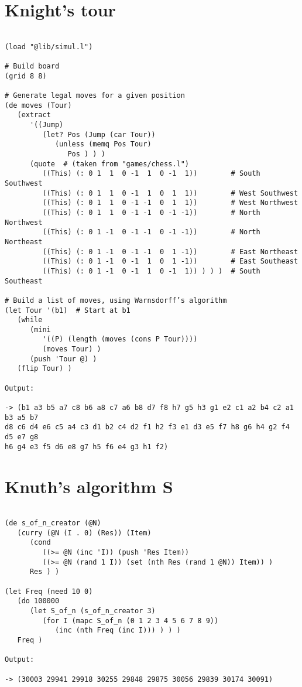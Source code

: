 \section*{Knight's tour}

\begin{verbatim}

(load "@lib/simul.l")

# Build board
(grid 8 8)

# Generate legal moves for a given position
(de moves (Tour)
   (extract
      '((Jump)
         (let? Pos (Jump (car Tour))
            (unless (memq Pos Tour)
               Pos ) ) )
      (quote  # (taken from "games/chess.l")
         ((This) (: 0 1  1  0 -1  1  0 -1  1))        # South Southwest
         ((This) (: 0 1  1  0 -1  1  0  1  1))        # West Southwest
         ((This) (: 0 1  1  0 -1 -1  0  1  1))        # West Northwest
         ((This) (: 0 1  1  0 -1 -1  0 -1 -1))        # North Northwest
         ((This) (: 0 1 -1  0 -1 -1  0 -1 -1))        # North Northeast
         ((This) (: 0 1 -1  0 -1 -1  0  1 -1))        # East Northeast
         ((This) (: 0 1 -1  0 -1  1  0  1 -1))        # East Southeast
         ((This) (: 0 1 -1  0 -1  1  0 -1  1)) ) ) )  # South Southeast

# Build a list of moves, using Warnsdorff’s algorithm
(let Tour '(b1)  # Start at b1
   (while
      (mini
         '((P) (length (moves (cons P Tour))))
         (moves Tour) )
      (push 'Tour @) )
   (flip Tour) )

Output:

-> (b1 a3 b5 a7 c8 b6 a8 c7 a6 b8 d7 f8 h7 g5 h3 g1 e2 c1 a2 b4 c2 a1 b3 a5 b7
d8 c6 d4 e6 c5 a4 c3 d1 b2 c4 d2 f1 h2 f3 e1 d3 e5 f7 h8 g6 h4 g2 f4 d5 e7 g8
h6 g4 e3 f5 d6 e8 g7 h5 f6 e4 g3 h1 f2)

\end{verbatim}

\section*{Knuth's algorithm S}

\begin{verbatim}

(de s_of_n_creator (@N)
   (curry (@N (I . 0) (Res)) (Item)
      (cond
         ((>= @N (inc 'I)) (push 'Res Item))
         ((>= @N (rand 1 I)) (set (nth Res (rand 1 @N)) Item)) )
      Res ) )

(let Freq (need 10 0)
   (do 100000
      (let S_of_n (s_of_n_creator 3)
         (for I (mapc S_of_n (0 1 2 3 4 5 6 7 8 9))
            (inc (nth Freq (inc I))) ) ) )
   Freq )

Output:

-> (30003 29941 29918 30255 29848 29875 30056 29839 30174 30091)

\end{verbatim}

